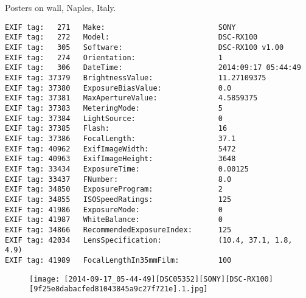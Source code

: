 \section{\protect{}}
\noindent Posters on wall, Naples, Italy.
\noindent
\begin{lstlisting}
EXIF tag:   271   Make:                          SONY
EXIF tag:   272   Model:                         DSC-RX100
EXIF tag:   305   Software:                      DSC-RX100 v1.00
EXIF tag:   274   Orientation:                   1
EXIF tag:   306   DateTime:                      2014:09:17 05:44:49
EXIF tag: 37379   BrightnessValue:               11.27109375
EXIF tag: 37380   ExposureBiasValue:             0.0
EXIF tag: 37381   MaxApertureValue:              4.5859375
EXIF tag: 37383   MeteringMode:                  5
EXIF tag: 37384   LightSource:                   0
EXIF tag: 37385   Flash:                         16
EXIF tag: 37386   FocalLength:                   37.1
EXIF tag: 40962   ExifImageWidth:                5472
EXIF tag: 40963   ExifImageHeight:               3648
EXIF tag: 33434   ExposureTime:                  0.00125
EXIF tag: 33437   FNumber:                       8.0
EXIF tag: 34850   ExposureProgram:               2
EXIF tag: 34855   ISOSpeedRatings:               125
EXIF tag: 41986   ExposureMode:                  0
EXIF tag: 41987   WhiteBalance:                  0
EXIF tag: 34866   RecommendedExposureIndex:      125
EXIF tag: 42034   LensSpecification:             (10.4, 37.1, 1.8, 4.9)
EXIF tag: 41989   FocalLengthIn35mmFilm:         100

\end{lstlisting}
\clearpage
\begin{figure}
\raggedleft
\texttt{[image: [2014-09-17\_05-44-49][DSC05352][SONY][DSC-RX100][9f25e8dabacfed81043845a9c27f721e].1.jpg]}
\end{figure}


\clearpage
